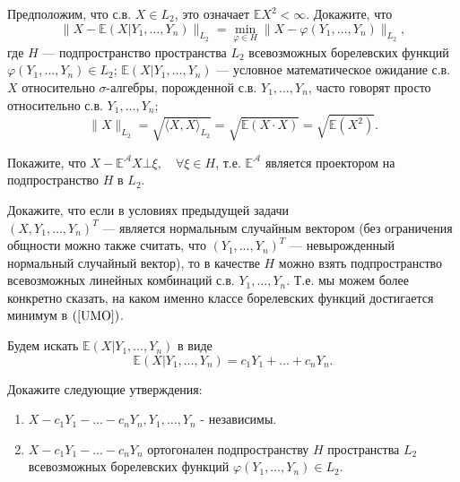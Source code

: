 \begin{problem}
Предположим, что с.в. $X\in L_2$, это означает ${\mathbb E}X^2<\infty$. Докажите, что 
\begin{equation}
\label{UMO}
\| X-{\mathbb E}(X|Y_1,\ldots,Y_n)\|_{L_2}=\min\limits_{\varphi\in H} \| X-\varphi(Y_1,\ldots,Y_n)\|_{L_2} , 
\end{equation}
где $H$ --- подпространство пространства $L_2$ всевозможных борелевских функций $\varphi(Y_1,\ldots,Y_n)\in L_2$; 
${\mathbb E}(X|Y_1,\ldots,Y_n)$ --- условное математическое ожидание с.в. $X$ относительно $\sigma$-алгебры, порожденной с.в. 
$Y_1,\ldots,Y_n$, часто говорят просто относительно с.в. $Y_1,\ldots,Y_n$; 
$$
\| X\|_{L_2}=\sqrt{\langle X,X\rangle_{L_2}}=\sqrt{{\mathbb E}(X\cdot X)}=\sqrt{{\mathbb E}(X^2)} . 
$$
\end{problem}

\begin{ordre}
Покажите, что $X-{\mathbb E}^{\mathcal A}X \bot \xi,\quad \forall\xi\in H$, т.е. ${\mathbb E}^{\mathcal A}$ 
является проектором на подпространство $H$ в $L_2$. 
\end{ordre}


\begin{problem}
Докажите, что если в условиях предыдущей задачи \\ $(X,Y_1,\ldots,Y_n)^T$ --- является нормальным случайным вектором (без ограничения 
общности можно также считать, что $(Y_1,\ldots,Y_n)^T$  --- невырожденный нормальный случайный вектор), то в качестве $H$ можно взять 
подпространство всевозможных линейных комбинаций с.в. $Y_1,\ldots,Y_n$. Т.е. мы можем более конкретно сказать, на каком именно 
классе борелевских функций достигается минимум в $(\ref{UMO})$. 
\end{problem}

\begin{ordre}
Будем искать 
${\mathbb E}(X|Y_1,\ldots,Y_n)$ в виде 
\begin{equation}
\label{Gauss}
{\mathbb E}(X|Y_1,\ldots,Y_n)=c_1 Y_1+\ldots +c_n Y_n . 
\end{equation}

Докажите следующие утверждения:

\begin{enumerate}
\item $X-c_1 Y_1-\ldots-c_n Y_n, Y_1,\ldots, Y_n$ - независимы.
\item $X-c_1 Y_1-\ldots-c_n Y_n$ ортогонален подпространству $H$ пространства $L_2$ всевозможных борелевских функций $\varphi(Y_1,\ldots,Y_n)\in L_2$.
\end{enumerate}
 
\end{ordre}
